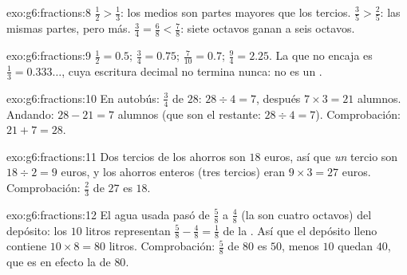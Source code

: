 \begin{solution}{exo:g6:fractions:8}
$\frac12 > \frac13$: los medios son partes mayores que los tercios.
$\frac35 > \frac25$: las mismas partes, pero más.
$\frac34 = \frac68 < \frac78$: siete octavos ganan a seis octavos.
\end{solution}

\begin{solution}{exo:g6:fractions:9}
$\frac12 = 0.5$; \quad $\frac34 = 0.75$; \quad
$\frac{7}{10} = 0.7$; \quad $\frac94 = 2.25$. La que no encaja es
$\frac13 = 0.333\dots$, cuya escritura decimal no termina nunca: no es un
.
\end{solution}

\begin{solution}{exo:g6:fractions:10}
En autobús: $\frac34$ de $28$: $28 \div 4 = 7$, después
$7 \times 3 = 21$ alumnos. Andando: $28 - 21 = 7$ alumnos (que son
el  restante: $28 \div 4 = 7$). Comprobación: $21 + 7 = 28$.
\end{solution}

\begin{solution}{exo:g6:fractions:11}
Dos tercios de los ahorros son $18$ euros, así que \emph{un} tercio son
$18 \div 2 = 9$ euros, y los ahorros enteros (tres tercios) eran
$9 \times 3 = 27$ euros. Comprobación: $\frac23$ de $27$ es $18$.
\end{solution}

\begin{solution}{exo:g6:fractions:12}
El agua usada pasó de $\frac58$ a $\frac48$ (la  son cuatro
octavos) del depósito: los $10$ litros representan
$\frac58 - \frac48 = \frac18$ de la . Así que el depósito lleno contiene
$10 \times 8 = 80$ litros. Comprobación: $\frac58$ de $80$ es $50$, menos
$10$ quedan $40$, que es en efecto la  de $80$.
\end{solution}

